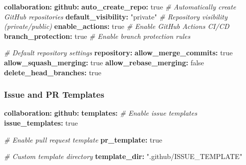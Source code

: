 \documentclass[
]{article}
\newenvironment{Shaded}{\begin{snugshade}}{\end{snugshade}}
\newcommand{\AttributeTok}[1]{\textcolor[rgb]{0.13,0.29,0.53}{#1}}
\newcommand{\CharTok}[1]{\textcolor[rgb]{0.31,0.60,0.02}{#1}}
\newcommand{\CommentTok}[1]{\textcolor[rgb]{0.56,0.35,0.01}{\textit{#1}}}
\newcommand{\FunctionTok}[1]{\textcolor[rgb]{0.13,0.29,0.53}{\textbf{#1}}}
\newcommand{\KeywordTok}[1]{\textcolor[rgb]{0.13,0.29,0.53}{\textbf{#1}}}
\newcommand{\StringTok}[1]{\textcolor[rgb]{0.31,0.60,0.02}{#1}}
\begin{document}
\begin{Shaded}
\begin{Highlighting}[]
\FunctionTok{collaboration}\KeywordTok{:}
\AttributeTok{  }\FunctionTok{github}\KeywordTok{:}
\AttributeTok{    }\FunctionTok{auto\_create\_repo}\KeywordTok{:}\AttributeTok{ }\CharTok{true}\CommentTok{          \# Automatically create GitHub repositories}
\AttributeTok{    }\FunctionTok{default\_visibility}\KeywordTok{:}\AttributeTok{ }\StringTok{"private"}\CommentTok{   \# Repository visibility (private/public)}
\AttributeTok{    }\FunctionTok{enable\_actions}\KeywordTok{:}\AttributeTok{ }\CharTok{true}\CommentTok{            \# Enable GitHub Actions CI/CD}
\AttributeTok{    }\FunctionTok{branch\_protection}\KeywordTok{:}\AttributeTok{ }\CharTok{true}\CommentTok{         \# Enable branch protection rules}

\CommentTok{    \# Default repository settings}
\AttributeTok{    }\FunctionTok{repository}\KeywordTok{:}
\AttributeTok{      }\FunctionTok{allow\_merge\_commits}\KeywordTok{:}\AttributeTok{ }\CharTok{true}
\AttributeTok{      }\FunctionTok{allow\_squash\_merging}\KeywordTok{:}\AttributeTok{ }\CharTok{true}
\AttributeTok{      }\FunctionTok{allow\_rebase\_merging}\KeywordTok{:}\AttributeTok{ }\CharTok{false}
\AttributeTok{      }\FunctionTok{delete\_head\_branches}\KeywordTok{:}\AttributeTok{ }\CharTok{true}
\end{Highlighting}
\end{Shaded}

\subsubsection{Issue and PR Templates}\label{issue-and-pr-templates}

\begin{Shaded}
\begin{Highlighting}[]
\FunctionTok{collaboration}\KeywordTok{:}
\AttributeTok{  }\FunctionTok{github}\KeywordTok{:}
\AttributeTok{    }\FunctionTok{templates}\KeywordTok{:}
\CommentTok{      \# Enable issue templates}
\AttributeTok{      }\FunctionTok{issue\_templates}\KeywordTok{:}\AttributeTok{ }\CharTok{true}

\CommentTok{      \# Enable pull request template}
\AttributeTok{      }\FunctionTok{pr\_template}\KeywordTok{:}\AttributeTok{ }\CharTok{true}

\CommentTok{      \# Custom template directory}
\AttributeTok{      }\FunctionTok{template\_dir}\KeywordTok{:}\AttributeTok{ }\StringTok{".github/ISSUE\_TEMPLATE"}
\end{Highlighting}
\end{Shaded}
\end{document}
